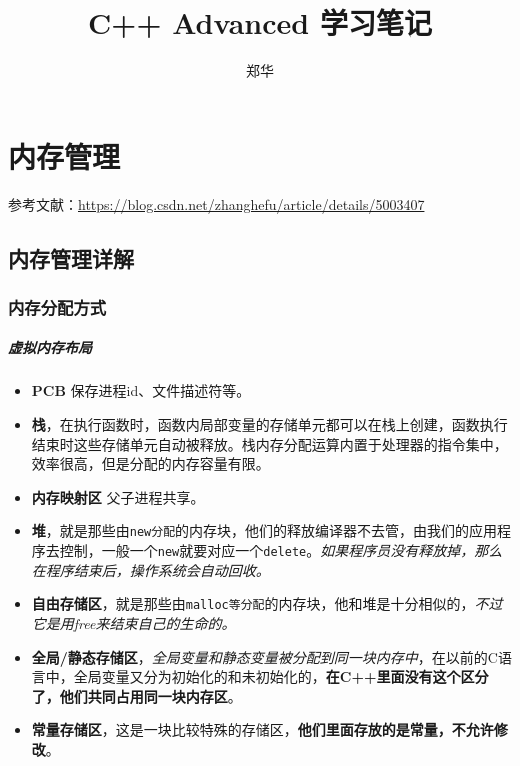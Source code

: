\documentclass[UTF8,a4paper,12pt]{ctexbook}
\author{\kaishu 郑华}
\title{ \textbf{C++ Advanced 学习笔记}}
\begin{document}
 	\maketitle
	\tableofcontents

\chapter{内存管理}
	参考文献：\url{https://blog.csdn.net/zhanghefu/article/details/5003407}
	
	\section{内存管理详解}
		\subsection{内存分配方式}
			\paragraph{虚拟内存布局}
				\begin{itemize}
					\item \textbf{PCB} 保存进程id、文件描述符等。
				
					\item \textbf{栈}，在执行函数时，函数内局部变量的存储单元都可以在栈上创建，函数执行结束时这些存储单元自动被释放。栈内存分配运算内置于处理器的指令集中，效率很高，但是分配的内存容量有限。
					
					\item \textbf{内存映射区} 父子进程共享。
					
					\item \textbf{堆}，就是那些由\verb|new分配|的内存块，他们的释放编译器不去管，由我们的应用程序去控制，一般一个\verb|new|就要对应一个\verb|delete|。\textit{如果程序员没有释放掉，那么在程序结束后，操作系统会自动回收。}
					
					\item \textbf{自由存储区}，就是那些由\verb|malloc等分配|的内存块，他和堆是十分相似的，\textit{不过它是用free来结束自己的生命的。}
					
					\item \textbf{全局/静态存储区}，\textit{全局变量和静态变量被分配到同一块内存中}，在以前的C语言中，全局变量又分为初始化的和未初始化的，\textbf{在C++里面没有这个区分了，他们共同占用同一块内存区}。
					
					\item \textbf{常量存储区}，这是一块比较特殊的存储区，\textbf{他们里面存放的是常量，不允许修改}。
				\end{itemize}
\end{document}
